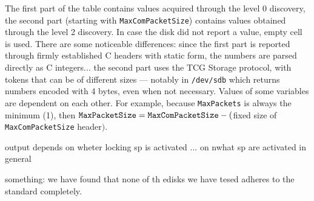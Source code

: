 The first part of the table contains values acquired through the level 0 discovery, the second part (starting with \verb|MaxComPacketSize|) contains values obtained through the level 2 discovery. In case the disk did not report a value, empty cell is used.
There are some noticeable differences: since the first part is reported through firmly established C headers with static form, the numbers are parsed directly as C integers... the second part uses the TCG Storage protocol, with tokens that can be of different sizes --- notably in \verb|/dev/sdb| which returns numbers encoded with 4 bytes, even when not necessary.
Values of some variables are dependent on each other. For example, because \verb|MaxPackets| is always the minimum (1), then $\verb|MaxPacketSize| = \verb|MaxComPacketSize| - ($fixed size of \verb|MaxComPacketSize| header$)$.


output depends on wheter locking sp is activated ... on nwhat sp are activated in general

something: we have found that none of th edisks we have tesed adheres to the standard completely.

